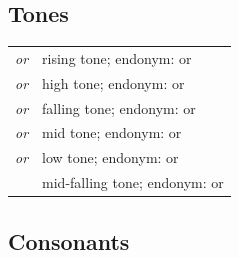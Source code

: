 \documentclass{article}
\begin{document}
\subsection{Tones}

\begin{xltabular}{\textwidth}{lL}
   \textit{or} \ipa{\v{}} & rising tone; endonym:  or  \\
   \textit{or} \ipa{\'{}} & high tone; endonym:  or  \\
   \textit{or} \ipa{\^{}} & falling tone; endonym:  or  \\
   \textit{or} \ipa{\={}} & mid tone; endonym:  or  \\
   \textit{or} \ipa{\`{}} & low tone; endonym:  or  \\
   & mid-falling tone; endonym:  or  \\
\end{xltabular}

\subsection{Consonants}
\end{document}
